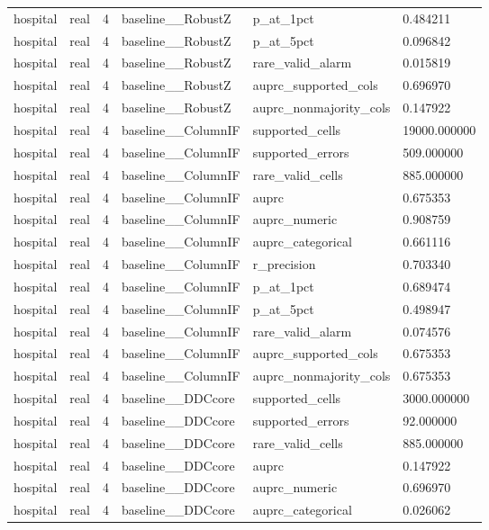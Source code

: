 \begin{tabular}{llllll}
hospital & real & 4 & baseline\_\_RobustZ & p\_at\_1pct & 0.484211 \\
hospital & real & 4 & baseline\_\_RobustZ & p\_at\_5pct & 0.096842 \\
hospital & real & 4 & baseline\_\_RobustZ & rare\_valid\_alarm & 0.015819 \\
hospital & real & 4 & baseline\_\_RobustZ & auprc\_supported\_cols & 0.696970 \\
hospital & real & 4 & baseline\_\_RobustZ & auprc\_nonmajority\_cols & 0.147922 \\
hospital & real & 4 & baseline\_\_ColumnIF & supported\_cells & 19000.000000 \\
hospital & real & 4 & baseline\_\_ColumnIF & supported\_errors & 509.000000 \\
hospital & real & 4 & baseline\_\_ColumnIF & rare\_valid\_cells & 885.000000 \\
hospital & real & 4 & baseline\_\_ColumnIF & auprc & 0.675353 \\
hospital & real & 4 & baseline\_\_ColumnIF & auprc\_numeric & 0.908759 \\
hospital & real & 4 & baseline\_\_ColumnIF & auprc\_categorical & 0.661116 \\
hospital & real & 4 & baseline\_\_ColumnIF & r\_precision & 0.703340 \\
hospital & real & 4 & baseline\_\_ColumnIF & p\_at\_1pct & 0.689474 \\
hospital & real & 4 & baseline\_\_ColumnIF & p\_at\_5pct & 0.498947 \\
hospital & real & 4 & baseline\_\_ColumnIF & rare\_valid\_alarm & 0.074576 \\
hospital & real & 4 & baseline\_\_ColumnIF & auprc\_supported\_cols & 0.675353 \\
hospital & real & 4 & baseline\_\_ColumnIF & auprc\_nonmajority\_cols & 0.675353 \\
hospital & real & 4 & baseline\_\_DDCcore & supported\_cells & 3000.000000 \\
hospital & real & 4 & baseline\_\_DDCcore & supported\_errors & 92.000000 \\
hospital & real & 4 & baseline\_\_DDCcore & rare\_valid\_cells & 885.000000 \\
hospital & real & 4 & baseline\_\_DDCcore & auprc & 0.147922 \\
hospital & real & 4 & baseline\_\_DDCcore & auprc\_numeric & 0.696970 \\
hospital & real & 4 & baseline\_\_DDCcore & auprc\_categorical & 0.026062 \\

\end{tabular}
